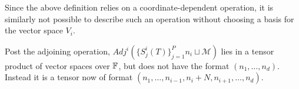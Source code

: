 \documentclass[../Lael_John_MasterThesis_Draft.tex]{subfiles}
\begin{document}
\begin{remark}
    Since the above definition relies on a coordinate-dependent operation, it is similarly not possible to describe such an operation without choosing a basis for the vector space $V_i$.
\end{remark}

Post the adjoining operation, $Adj^i(\{S^i_j(T)\}_{j=1}^P{n_i} \sqcup \mathcal{M})$ lies in a tensor product of vector spaces over $\mathbb{F}$, but does not have the format $(n_1, \ldots, n_d)$. Instead it is a tensor now of format $(n_1, \ldots, n_{i-1}, n_i + N, n_{i+1}, \ldots, n_d)$.
\end{document}
